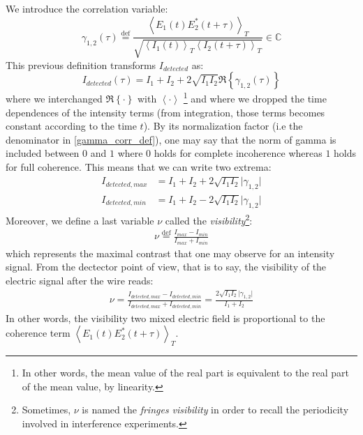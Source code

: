 \documentclass[11pt]{report}
\begin{document}
We introduce the correlation variable:
\begin{equation}
\label{gamma_corr_def}
\gamma_{1,2}(\tau) \stackrel{\text{def}}{=} \frac{\left\langle E_1(t) E_2^*(t + \tau) \right\rangle _T}{\sqrt{\left\langle I_1(t) \right\rangle_T \left\langle I_2(t + \tau) \right\rangle _T }} \in \mathbb{C}
\end{equation}
This previous definition transforms $I_{detected}$ as:
\begin{equation}
I_{detected}(\tau) = I_1 + I_2 + 2\sqrt{I_1 I_2} \Re \left\lbrace \gamma_{1,2}(\tau) \right\rbrace
\end{equation}
where we interchanged $\Re \left\lbrace \cdot \right\rbrace$ with $\left\langle \cdot \right \rangle$ \footnote{In other words, the mean value of the real part is equivalent to the real part of the mean value, by linearity.} and where we dropped the time dependences of the intensity terms (from integration, those terms becomes constant according to the time $t$).
By its normalization factor (i.e the denominator in \eqref{gamma_corr_def}), one may say that the norm of gamma is included between $0$ and $1$ where $0$ holds for complete incoherence whereas $1$ holds for full coherence. This means that we can write two extrema:
\begin{align}
I_{detected, max} &= I_1 + I_2 + 2\sqrt{I_1 I_2} \vert \gamma_{1,2} \vert\\
I_{detected, min} &= I_1 + I_2 - 2\sqrt{I_1 I_2} \vert \gamma_{1,2} \vert
\end{align}
Moreover, we define a last variable $\nu$ called the \textit{visibility}\footnote{Sometimes, $\nu$ is named the \textit{fringes visibility} in order to recall the periodicity involved in interference experiments.}:
\begin{align}
\label{def_visibility}
\nu \stackrel{\text{def}}{=} \frac{I_{max} - I_{min}}{I_{max} + I_{min}}
\end{align}
which represents the maximal contrast that one may observe for an intensity signal. From the dectector point of view, that is to say, the visibility of the electric signal after the wire reads:
\begin{align}
\nu = \frac{I_{detected, max} - I_{detected, min}}{I_{detected, max} + I_{detected, min}} = \frac{2\sqrt{I_1 I_2} \vert \gamma_{1,2} \vert}{I_1 + I_2}
\end{align}
In other words, the visibility two mixed electric field is proportional to the coherence term $\left\langle E_1(t) E_2^*(t + \tau) \right\rangle _T$.
\end{document}
